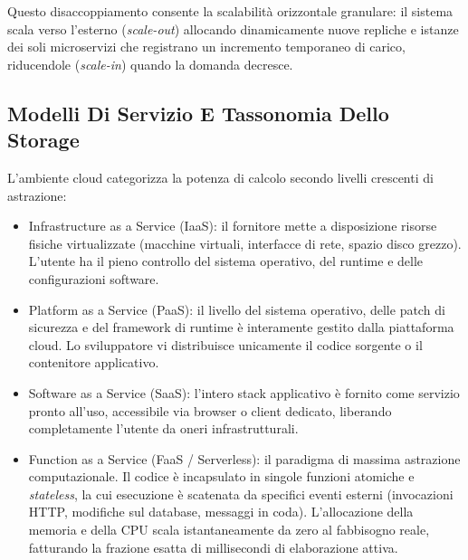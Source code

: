 \documentclass[11pt, a4paper]{article}
\begin{document}
Questo disaccoppiamento consente la scalabilità orizzontale granulare: il sistema scala verso l'esterno (\emph{scale-out}) allocando dinamicamente nuove repliche e istanze dei soli microservizi che registrano un incremento temporaneo di carico, riducendole (\emph{scale-in}) quando la domanda decresce.

\subsection{Modelli Di Servizio E Tassonomia Dello Storage}

L'ambiente cloud categorizza la potenza di calcolo secondo livelli crescenti di astrazione:
\begin{itemize}[noitemsep]
    \item Infrastructure as a Service (IaaS): il fornitore mette a disposizione risorse fisiche virtualizzate (macchine virtuali, interfacce di rete, spazio disco grezzo). L'utente ha il pieno controllo del sistema operativo, del runtime e delle configurazioni software.
    \item Platform as a Service (PaaS): il livello del sistema operativo, delle patch di sicurezza e del framework di runtime è interamente gestito dalla piattaforma cloud. Lo sviluppatore vi distribuisce unicamente il codice sorgente o il contenitore applicativo.
    \item Software as a Service (SaaS): l'intero stack applicativo è fornito come servizio pronto all'uso, accessibile via browser o client dedicato, liberando completamente l'utente da oneri infrastrutturali.
    \item Function as a Service (FaaS / Serverless): il paradigma di massima astrazione computazionale. Il codice è incapsulato in singole funzioni atomiche e \emph{stateless}, la cui esecuzione è scatenata da specifici eventi esterni (invocazioni HTTP, modifiche sul database, messaggi in coda). L'allocazione della memoria e della CPU scala istantaneamente da zero al fabbisogno reale, fatturando la frazione esatta di millisecondi di elaborazione attiva.
\end{itemize}
\end{document}
